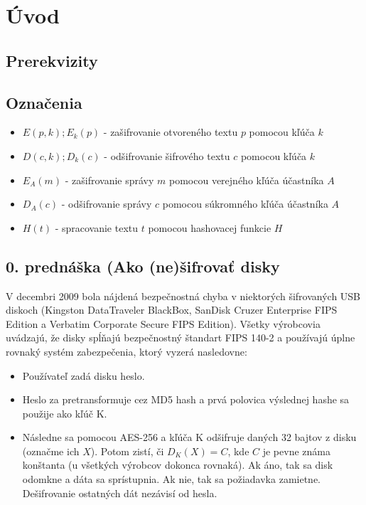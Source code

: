 \chapter{Úvod}\label{chapter:uvod}

\section{Prerekvizity}

\section{Označenia}

\begin{itemize}
\item $E(p,k); E_k(p)$ - zašifrovanie otvoreného textu $p$ pomocou kľúča $k$
\item $D(c,k); D_k(c)$ - odšifrovanie šifrového textu $c$ pomocou kľúča $k$
\item $E_A(m)$ - zašifrovanie správy $m$ pomocou verejného kľúča účastníka $A$
\item $D_A(c)$ - odšifrovanie správy $c$ pomocou súkromného kľúča účastníka $A$
\item $H(t)$ - spracovanie textu $t$ pomocou hashovacej funkcie $H$
\end{itemize}

\section{0. prednáška (Ako (ne)šifrovať disky}

V decembri 2009 bola nájdená bezpečnostná chyba v niektorých šifrovaných USB diskoch
(Kingston DataTraveler BlackBox, SanDisk Cruzer Enterprise FIPS Edition a
Verbatim Corporate Secure FIPS Edition). Všetky výrobcovia uvádzajú, že disky
spĺňajú bezpečnostný štandart FIPS 140-2 a používajú úplne rovnaký systém zabezpečenia,
ktorý vyzerá nasledovne:
\begin{itemize}
\item Používateľ zadá disku heslo.
\item Heslo za pretransformuje cez MD5 hash a prvá polovica výslednej hashe sa použije ako kľúč K.
\item Následne sa pomocou AES-256 a kľúča K odšifruje daných 32 bajtov z disku (označme ich $X$). Potom zistí, či
$D_K(X)=C$, kde $C$ je pevne známa konštanta (u všetkých výrobcov dokonca rovnaká). Ak áno, tak sa disk odomkne a dáta sa sprístupnia.
Ak nie, tak sa požiadavka zamietne. Dešifrovanie ostatných dát nezávisí od hesla.
\end{itemize}

